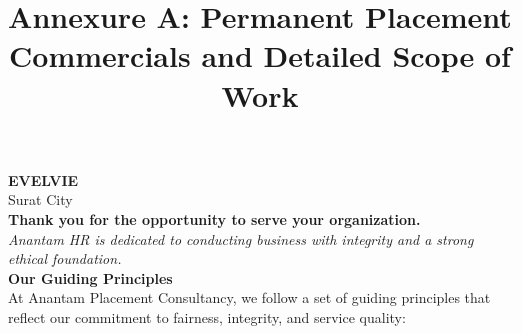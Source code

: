 \documentclass{article}
\title{\textbf{\color{primary} Annexure A: Permanent Placement Commercials and Detailed Scope of Work}}
\date{}
\begin{document}
\maketitle

\noindent\textbf{EVELVIE}\\
Surat City\\[1em]

\noindent\textbf{Thank you for the opportunity to serve your organization.}\\[0.5em]
\noindent\textit{Anantam HR is dedicated to conducting business with integrity and a strong ethical foundation.}\\[1em]

\noindent\textbf{\color{secondary} Our Guiding Principles}\\[0.5em]
\noindent At Anantam Placement Consultancy, we follow a set of guiding principles that reflect our commitment to fairness, integrity, and service quality:
\end{document}
